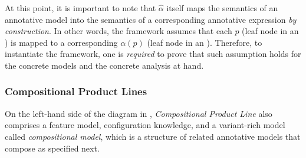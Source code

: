 

At this point, it is important to note that $\hat{\alpha}$ itself maps the semantics of an annotative model into the semantics of a corresponding annotative expression \emph{by construction}.
In other words, the framework assumes that each  $p$ (leaf node in an ) is mapped to a corresponding  $\alpha(p)$ (leaf node in an ).
Therefore, to instantiate the framework, one is \emph{required} to prove that such assumption holds for the concrete models and the concrete analysis at hand.

\subsubsection{Compositional Product Lines}
\label{sec:compositionalSPL}

On the left-hand side of the diagram in , \textit{Compositional Product Line} also comprises a feature model, configuration knowledge, and a variant-rich model called \textit{compositional model}, which is a structure of related annotative models that compose as specified next.


